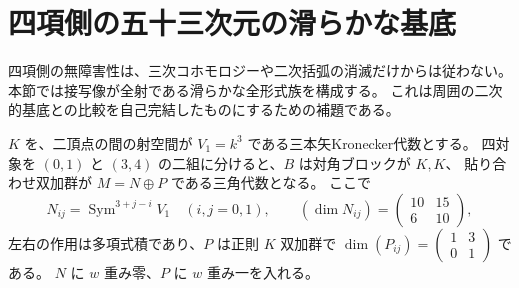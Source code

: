 \section{四項側の五十三次元の滑らかな基底}
\label{sec:vk-smooth-hull-v31}

四項側の無障害性は、三次コホモロジーや二次括弧の消滅だけからは従わない。
本節では接写像が全射である滑らかな全形式族を構成する。
これは周囲の二次的基底との比較を自己完結したものにするための補題である。

$K$ を、二頂点の間の射空間が $V_1=k^3$ である三本矢Kronecker代数とする。
四対象を $(0,1)$ と $(3,4)$ の二組に分けると、$B$ は対角ブロックが $K,K$、
貼り合わせ双加群が $M=N\oplus P$ である三角代数となる。
ここで
\[
 N_{ij}=\operatorname{Sym}^{3+j-i}V_1\quad(i,j=0,1),\qquad
 (\dim N_{ij})=\begin{pmatrix}10&15\\6&10\end{pmatrix},
\]
左右の作用は多項式積であり、$P$ は正則 $K$ 双加群で
$\dim(P_{ij})=\left(\begin{smallmatrix}1&3\\0&1\end{smallmatrix}\right)$ である。
$N$ に $w$ 重み零、$P$ に $w$ 重み一を入れる。

